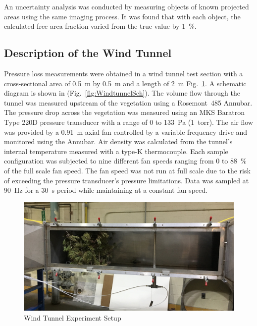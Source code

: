 \documentclass[12pt]{article}
\begin{document}
An uncertainty analysis was conducted by measuring objects of known projected areas using the same imaging process. It was found that with each object, the calculated free area fraction varied from the true value by 1~\%.

\subsection{Description of the Wind Tunnel}
\label{ssec:headingscap}

Pressure loss measurements were obtained in a wind tunnel test section with a cross-sectional area of 0.5~\si{m} by 0.5~\si{m} and a length of 2~\si{m} Fig.~\ref{fig:WindtunnelPic}. A schematic diagram is shown in (Fig.~\ref{fig:WindtunnelSch}). The volume flow through the tunnel was measured upstream of the vegetation using a Rosemont~485 Annubar. The pressure drop across the vegetation was measured using an MKS Baratron Type 220D pressure transducer with a range of 0 to 133~Pa (1~torr). The air flow was provided by a 0.91~m axial fan controlled by a variable frequency drive and monitored using the Annubar. Air density was calculated from the tunnel's internal temperature measured with a type-K thermocouple. Each sample configuration was subjected to nine different fan speeds ranging from 0 to 88~\% of the full scale fan speed. The fan speed was not run at full scale due to the risk of exceeding the pressure transducer's pressure limitations. Data was sampled at 90~\si{Hz} for a 30~\si{s} period while maintaining at a constant fan speed.

\begin{figure} [!]
	\centering 	
    \includegraphics[width=1.0\linewidth]{Picture4.jpg}
	\caption{Wind Tunnel Experiment Setup}
	\label{fig:WindtunnelPic}
\end{figure}
\end{document}
